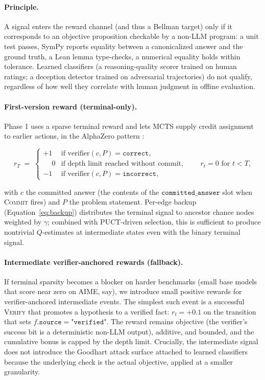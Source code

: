 \paragraph{Principle.}
A signal enters the reward channel (and thus a Bellman target) only if
it corresponds to an objective proposition checkable by a non-LLM
program: a unit test passes, SymPy reports equality between a
canonicalized answer and the ground truth, a Lean lemma type-checks, a
numerical equality holds within tolerance. Learned classifiers (a
reasoning-quality scorer trained on human ratings; a deception detector
trained on adversarial trajectories) do not qualify, regardless of how
well they correlate with human judgment in offline evaluation.

\paragraph{First-version reward (terminal-only).}
Phase 1 uses a sparse terminal reward and lets MCTS supply credit
assignment to earlier actions, in the AlphaZero pattern
\citep{silver2017alphagozero}:

\begin{equation}
\label{eq:rewardterminal}
r_T \;=\;
\begin{cases}
+1 & \text{if } \mathrm{verifier}(c, P) = \texttt{correct}, \\
\phantom{+}0 & \text{if depth limit reached without commit}, \\
-1 & \text{if } \mathrm{verifier}(c, P) = \texttt{incorrect},
\end{cases}
\qquad r_t = 0 \text{ for } t < T,
\end{equation}

with $c$ the committed answer (the contents of the
$\texttt{committed\_answer}$ slot when \textsc{Commit} fires) and
$P$ the problem statement. Per-edge backup (Equation~\ref{eq:backup})
distributes the terminal signal to ancestor chance nodes weighted by
$\gamma$; combined with PUCT-driven selection, this is sufficient to
produce nontrivial $Q$-estimates at intermediate states even with the
binary terminal signal.

\paragraph{Intermediate verifier-anchored rewards (fallback).}
If terminal sparsity becomes a blocker on harder benchmarks (small base
models that score near zero on AIME, say), we introduce small positive
rewards for verifier-anchored intermediate events. The simplest such
event is a successful \textsc{Verify} that promotes a
hypothesis to a verified fact: $r_t = +0.1$ on the transition that
sets $f.\texttt{source} = \texttt{"verified"}$. The reward remains
objective (the verifier's success bit is a deterministic non-LLM
output), additive, and bounded, and the cumulative bonus is capped by
the depth limit. Crucially, the intermediate signal does not introduce
the Goodhart attack surface attached to learned classifiers because
the underlying check is the actual objective, applied at a smaller
granularity.

